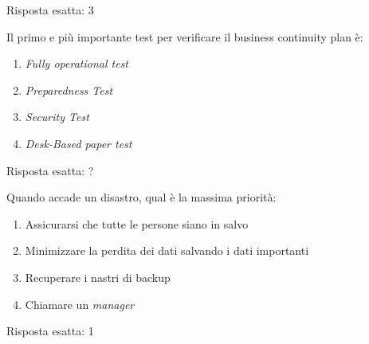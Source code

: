\begin{Answer} [
  ref={bcdr5},
  number={5}
 ]

 \Question Risposta esatta: 3

\end{Answer}


\begin{Exercise} [
  title={Quiz},
  label={bcdr6}
 ]

 \Question Il primo e più importante test per verificare il business
 continuity plan è:
 \begin{enumerate}
   \item \textit{Fully operational test}
   \item \textit{Preparedness Test}
   \item \textit{Security Test}
   \item \textit{Desk-Based paper test}
 \end{enumerate}

\end{Exercise}

\begin{Answer} [
  ref={bcdr6},
  number={6}
 ]

 \Question Risposta esatta: ?

\end{Answer}


\begin{Exercise} [
  title={Quiz},
  label={bcdr7}
 ]

 \Question Quando accade un disastro, qual è la massima priorità:
 \begin{enumerate}
   \item Assicurarsi che tutte le persone siano in salvo
   \item Minimizzare la perdita dei dati salvando i dati importanti
   \item Recuperare i nastri di backup
   \item Chiamare un \textit{manager}
 \end{enumerate}

\end{Exercise}

\begin{Answer} [
  ref={bcdr7},
  number={7}
 ]

 \Question Risposta esatta: 1

\end{Answer}


